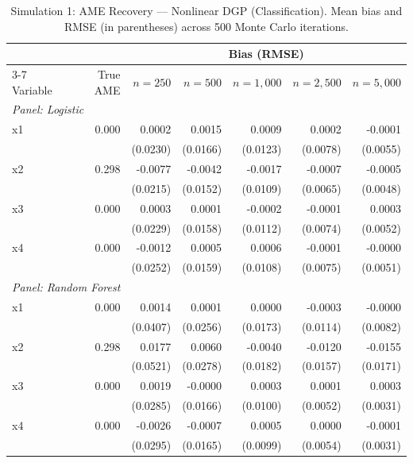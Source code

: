 \documentclass[12pt]{article}
\begin{document}
	\begin{table}[htbp]
		\centering
		\small
		\begin{threeparttable}
			\caption{Simulation 1: AME Recovery --- Nonlinear DGP (Classification). Mean bias and RMSE (in parentheses) across 500 Monte Carlo iterations.}
			\label{tab:sim1_classification_nonlinear}
			\begin{tabular}{lrrrrrr}
				\toprule
				& & \multicolumn{5}{c}{Bias (RMSE)} \\
				\cmidrule(lr){3-7}
				Variable & True AME & $n=250$ & $n=500$ & $n=1,000$ & $n=2,500$ & $n=5,000$ \\
				\midrule
				\multicolumn{7}{l}{\textit{Panel: Logistic}} \\
				\quad x1 & 0.000 & 0.0002 & 0.0015 & 0.0009 & 0.0002 & -0.0001 \\
				&  & (0.0230) & (0.0166) & (0.0123) & (0.0078) & (0.0055) \\
				\quad x2 & 0.298 & -0.0077 & -0.0042 & -0.0017 & -0.0007 & -0.0005 \\
				&  & (0.0215) & (0.0152) & (0.0109) & (0.0065) & (0.0048) \\
				\quad x3 & 0.000 & 0.0003 & 0.0001 & -0.0002 & -0.0001 & 0.0003 \\
				&  & (0.0229) & (0.0158) & (0.0112) & (0.0074) & (0.0052) \\
				\quad x4 & 0.000 & -0.0012 & 0.0005 & 0.0006 & -0.0001 & -0.0000 \\
				&  & (0.0252) & (0.0159) & (0.0108) & (0.0075) & (0.0051) \\
				\midrule
				\multicolumn{7}{l}{\textit{Panel: Random Forest}} \\
				\quad x1 & 0.000 & 0.0014 & 0.0001 & 0.0000 & -0.0003 & -0.0000 \\
				&  & (0.0407) & (0.0256) & (0.0173) & (0.0114) & (0.0082) \\
				\quad x2 & 0.298 & 0.0177 & 0.0060 & -0.0040 & -0.0120 & -0.0155 \\
				&  & (0.0521) & (0.0278) & (0.0182) & (0.0157) & (0.0171) \\
				\quad x3 & 0.000 & 0.0019 & -0.0000 & 0.0003 & 0.0001 & 0.0003 \\
				&  & (0.0285) & (0.0166) & (0.0100) & (0.0052) & (0.0031) \\
				\quad x4 & 0.000 & -0.0026 & -0.0007 & 0.0005 & 0.0000 & -0.0001 \\
				&  & (0.0295) & (0.0165) & (0.0099) & (0.0054) & (0.0031) \\
				\midrule

\end{tabular}
\end{threeparttable}
\end{table}
\end{document}
